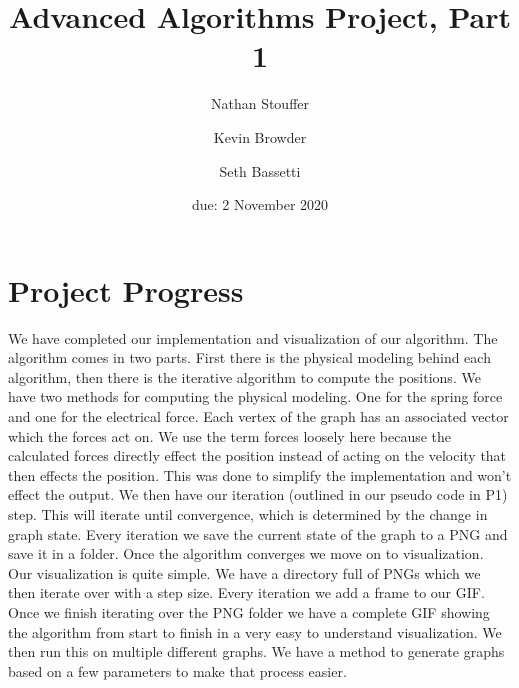 \documentclass{article}
\title{Advanced Algorithms Project, Part 1}
\author{Nathan Stouffer \and Kevin Browder \and Seth Bassetti}
\date{due: 2 November 2020}
\begin{document}
\maketitle

\section{Project Progress}
We have completed our implementation and visualization of our algorithm. The algorithm comes in two parts. First there is the physical modeling behind each algorithm, then there is the iterative algorithm to compute the positions. We have two methods for computing the physical modeling. One for the spring force and one for the electrical force. Each vertex of the graph has an associated vector which the forces act on. We use the term forces loosely here because the calculated forces directly effect the position instead of acting on the velocity that then effects the position. This was done to simplify the implementation and won't effect the output. We then have our iteration (outlined in our pseudo code in P1) step. This will iterate until convergence, which is determined by the change in graph state. Every iteration we save the current state of the graph to a PNG and save it in a folder. Once the algorithm converges we move on to visualization. \\
Our visualization is quite simple. We have a directory full of PNGs which we then iterate over with a step size. Every iteration we add a frame to our GIF. Once we finish iterating over the PNG folder we have a complete GIF showing the algorithm from start to finish in a very easy to understand visualization. We then run this on multiple different graphs. We have a method to generate graphs based on a few parameters to make that process easier. 
\end{document}
